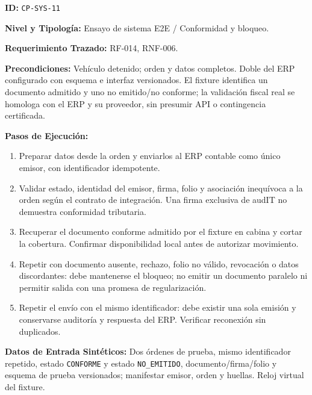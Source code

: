 \par\noindent\textbf{ID:} \texttt{C\allowbreak{}P\allowbreak{}-\allowbreak{}S\allowbreak{}Y\allowbreak{}S\allowbreak{}-\allowbreak{}1\allowbreak{}1\allowbreak{}}\par
\par\noindent\textbf{Nivel y Tipología:} Ensayo de sistema E2E / Conformidad y bloqueo.\par
\par\noindent\textbf{Requerimiento Trazado:} RF-014, RNF-006.\par
\par\noindent\textbf{Precondiciones:} Vehículo detenido; orden y datos completos. Doble del ERP configurado con esquema e interfaz versionados. El fixture identifica un documento admitido y uno no emitido/no conforme; la validación fiscal real se homologa con el ERP y su proveedor, sin presumir API o contingencia certificada.\par
\par\noindent\textbf{Pasos de Ejecución:} \par
\begin{enumerate}
\item Preparar datos desde la orden y enviarlos al ERP contable como único emisor, con identificador idempotente.
\item Validar estado, identidad del emisor, firma, folio y asociación inequívoca a la orden según el contrato de integración. Una firma exclusiva de audIT no demuestra conformidad tributaria.
\item Recuperar el documento conforme admitido por el fixture en cabina y cortar la cobertura. Confirmar disponibilidad local antes de autorizar movimiento.
\item Repetir con documento ausente, rechazo, folio no válido, revocación o datos discordantes: debe mantenerse el bloqueo; no emitir un documento paralelo ni permitir salida con una promesa de regularización.
\item Repetir el envío con el mismo identificador: debe existir una sola emisión y conservarse auditoría y respuesta del ERP. Verificar reconexión sin duplicados.
\end{enumerate}
\par\noindent\textbf{Datos de Entrada Sintéticos:} Dos órdenes de prueba, mismo identificador repetido, estado \texttt{C\allowbreak{}O\allowbreak{}N\allowbreak{}F\allowbreak{}O\allowbreak{}R\allowbreak{}M\allowbreak{}E\allowbreak{}} y estado \texttt{N\allowbreak{}O\allowbreak{}\_\allowbreak{}E\allowbreak{}M\allowbreak{}I\allowbreak{}T\allowbreak{}I\allowbreak{}D\allowbreak{}O\allowbreak{}}, documento/firma/folio y esquema de prueba versionados; manifestar emisor, orden y huellas. Reloj virtual del fixture.\par
